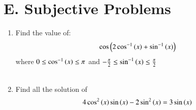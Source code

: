 \documentclass[journal,12pt,twocolumn,article]{IEEEtran}
\theoremstyle{remark}
\begin{document}
\section*{E. Subjective Problems}
\begin{enumerate}
\item Find the value of: 
\begin{align*}
\cos \left(2\cos ^{-1}\left(x\right)+\sin ^{-1}\left(x\right)\right) 
\end{align*}
where $0\le \cos ^{-1}\left(x\right) \le \pi$ and $-\frac{\pi}{2}\le \sin ^{-1}\left(x\right) \le\frac{\pi}{2}$
\hfill {}\\\\
\item Find all the solution of
\begin{align*}
4\cos ^2\left(x\right)\sin \left(x\right)-2\sin ^2 \left(x\right) = 3\sin \left(x\right)
\end{align*}
\hfill {}

\end{enumerate}
\end{document}
